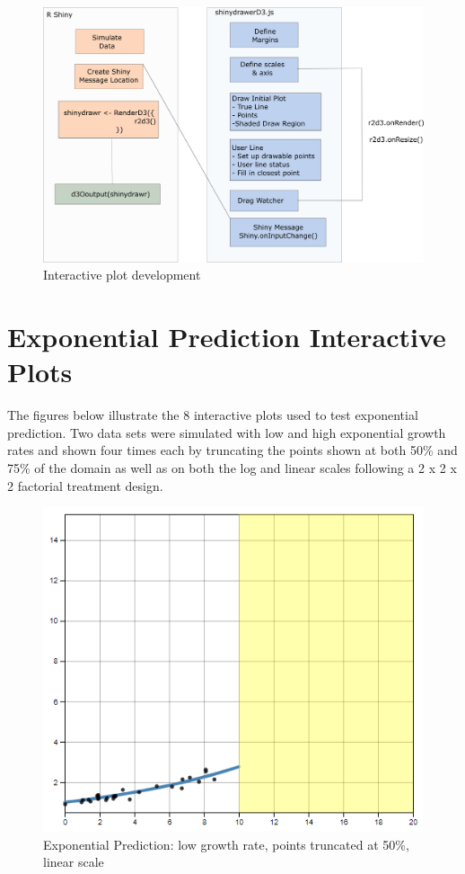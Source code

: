 \documentclass[print]{nuthesis}
\begin{document}
\begin{figure}[tbp]

{\centering \includegraphics[width=0.8\linewidth,]{images/r2d3+shiny-inkscape} 

}

\caption{Interactive plot development}\label{fig:r2d3-shiny-flowchart}
\end{figure}

\hypertarget{exponential-prediction-plots}{%
\chapter{Exponential Prediction Interactive Plots}\label{exponential-prediction-plots}}

The figures below illustrate the 8 interactive plots used to test exponential prediction.
Two data sets were simulated with low and high exponential growth rates and shown four times each by truncating the points shown at both 50\% and 75\% of the domain as well as on both the log and linear scales following a 2 x 2 x 2 factorial treatment design.

\begin{figure}[tbp]

{\centering \includegraphics[width=0.65\linewidth,]{images/low-10-linear} 

}

\caption{Exponential Prediction: low growth rate, points truncated at 50\%, linear scale}\label{fig:low-10-linear}
\end{figure}
\end{document}
